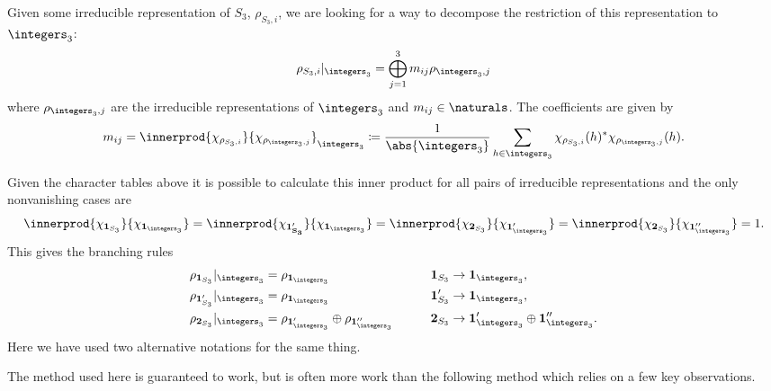 \begin{exm}{}{}
    Given some irreducible representation of \(S_3\), \(\rho_{S_3, i}\), we
    are looking for a way to decompose the restriction of this representation to
    \(\integers_3\):
    \begin{equation}
        \rho_{S_3, i}|_{\integers_3} = \bigoplus_{j = 1}^{3} m_{ij}
        \rho_{\integers_3, j}
    \end{equation}
    where \(\rho_{\integers_3, j}\) are the irreducible representations of
    \(\integers_3\) and \(m_{ij} \in \naturals\).
    The coefficients are given by
    \begin{equation}
        m_{ij} = \innerprod{\chi_{\rho_{S_3, i}}}{\chi_{\rho_{\integers_3,
                    j}}}_{\integers_3} \coloneqq \frac{1}{\abs{\integers_3}} \sum_{h \in
            \integers_3} \chi_{\rho_{S_3,i}}(h)^* \chi_{\rho_{\integers_3,j}}(h).
    \end{equation}
    
    Given the character tables above it is possible to calculate this inner
    product for all pairs of irreducible representations and the only nonvanishing
    cases are
    \begin{equation}
        \innerprod{\chi_{\rep{1}_{S_3}}}{\chi_{\rep{1}_{\integers_3}}} = 
        \innerprod{\chi_{\rep{1'_{S_3}}}}{\chi_{\rep{1}_{\integers_3}}} = 
        \innerprod{\chi_{\rep{2}_{S_3}}}{\chi_{\rep{1}'_{\integers_3}}} = 
        \innerprod{\chi_{\rep{2}_{S_3}}}{\chi_{\rep{1}''_{\integers_3}}} = 1.
    \end{equation}
    This gives the branching rules
    \begin{alignat}{4}
        \rho_{\rep{1}_{S_3}}|_{\integers_3} &= \rho_{\rep{1}_{\integers_3}}
        \qquad & \rep{1}_{S_3} &\to \rep{1}_{\integers_3},\\
        \rho_{\rep{1}'_{S_3}}|_{\integers_3} &= \rho_{\rep{1}_{\integers_3}}
        \qquad & \rep{1}'_{S_3} &\to \rep{1}_{\integers_3},\\
        \rho_{\rep{2}_{S_3}}|_{\integers_3} &= \rho_{\rep{1}'_{\integers_3}}
        \directsum \rho_{\rep{1}''_{\integers_3}} \qquad & \rep{2}_{S_3} &\to
        \rep{1}'_{\integers_3} \directsum \rep{1}''_{\integers_3}.
    \end{alignat}
    Here we have used two alternative notations for the same thing.
\end{exm}

The method used here is guaranteed to work, but is often more work than the
following method which relies on a few key observations.

